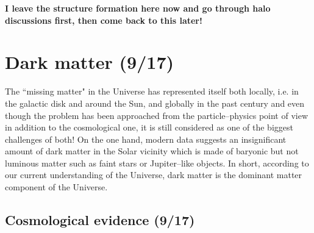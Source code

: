 \documentclass[paper=a4, fontsize=11pt]{scrartcl} %
\numberwithin{equation}{section} %
\numberwithin{figure}{section} %
\numberwithin{table}{section} %
\begin{document}
{\bf I leave the structure formation here now and go through halo discussions first, then come back to this later!}

\label{sec:structure formation}

\newpage
\section{Dark matter (9/17)}
The ``missing matter" in the Universe has represented itself both locally, i.e. in the galactic disk and around the Sun, and globally in the past century and even though the problem has been approached from the particle--physics point of view in addition to the cosmological one, it is still considered as one of the biggest challenges of both! On the one hand, modern data suggests an insignificant amount of dark matter in the Solar vicinity which is made of baryonic but not luminous matter such as faint stars or Jupiter--like objects. In short, according to our current understanding of the Universe, dark matter is the dominant matter component of the Universe.

\subsection{Cosmological evidence (9/17)}
\end{document}
